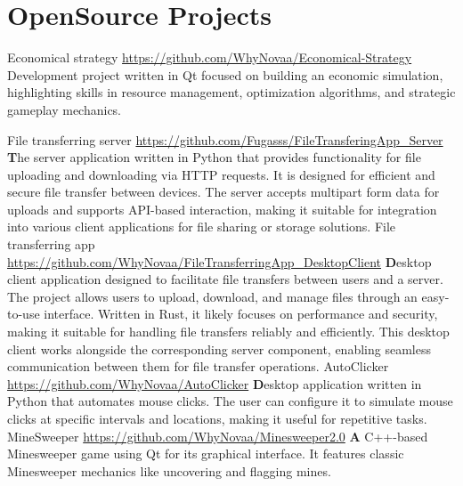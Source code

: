 \documentclass[11pt,a4paper]{moderncv}
\begin{document}
\maketitle
\section{OpenSource Projects}
  \cvline
    {Economical strategy}
    {\url{https://github.com/WhyNovaa/Economical-Strategy}\newline{}
    \textbfgame Development project written in Qt focused on building an economic simulation, highlighting skills in resource management, optimization algorithms, and strategic gameplay mechanics.\newline{}
    }

  \cvline
    {File transferring server}
    {\url{https://github.com/Fugasss/FileTransferingApp_Server}\newline{}
    \textbf
    The server application written in Python that provides functionality for file uploading and downloading via HTTP requests. It is designed for efficient and secure file transfer between devices. The server accepts multipart form data for uploads and supports API-based interaction, making it suitable for integration into various client applications for file sharing or storage solutions.\newline{}
    }
  \cvline
    {File transferring app}
    {\url{https://github.com/WhyNovaa/FileTransferringApp_DesktopClient}\newline{}
    \textbf
    Desktop client application designed to facilitate file transfers between users and a server. The project allows users to upload, download, and manage files through an easy-to-use interface. Written in Rust, it likely focuses on performance and security, making it suitable for handling file transfers reliably and efficiently. This desktop client works alongside the corresponding server component, enabling seamless communication between them for file transfer operations.\newline{}
    }
  \cvline 
    {AutoClicker}
    {\url{https://github.com/WhyNovaa/AutoClicker}\newline{}
    \textbf Desktop application written in Python that automates mouse clicks. The user can configure it to simulate mouse clicks at specific intervals and locations, making it useful for repetitive tasks.\newline{}
    }
  \cvline
    {MineSweeper}
    {\url{https://github.com/WhyNovaa/Minesweeper2.0}\newline{}
    \textbf A C++-based Minesweeper game using Qt for its graphical interface. It features classic Minesweeper mechanics like uncovering and flagging mines.
    }
    
\end{document}
